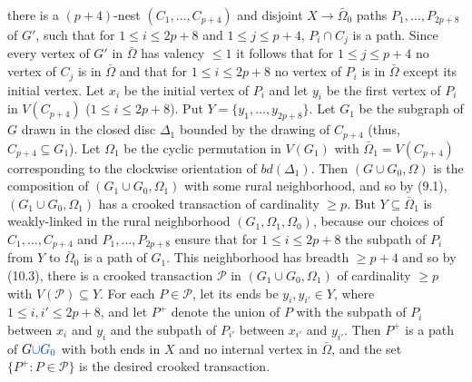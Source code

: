\noindent there is a $(p+4)$-nest $(C_1, \dots, C_{p+4})$ and disjoint $X \to \bar{\Omega}_0$ paths $P_1, \dots, P_{2p+8}$ of $G'$, such that for $1 \le i \le 2p+8$ and $1 \le j \le p+4$, $P_i \cap C_j$ is a path. Since every vertex of $G'$ in $\bar{\Omega}$ has valency $\le 1$ it follows that for $1 \le j \le p+4$ no vertex of $C_j$ is in $\bar{\Omega}$ and that for $1 \le i \le 2p+8$ no vertex of $P_i$ is in $\bar{\Omega}$ except its initial vertex. Let $x_i$ be the initial vertex of $P_i$ and let $y_i$ be the first vertex of $P_i$ in $V(C_{p+4})$ ($1 \le i \le 2p+8$). Put $Y = \{y_1, \dots, y_{2p+8}\}$. Let $G_1$ be the subgraph of $G$ drawn in the closed disc $\Delta_1$ bounded by the drawing of $C_{p+4}$ (thus, $C_{p+4} \subseteq G_1$). Let $\Omega_1$ be the cyclic permutation in $V(G_1)$ with $\bar{\Omega}_1 = V(C_{p+4})$ corresponding to the clockwise orientation of $bd(\Delta_1)$. Then $(G \cup G_0, \Omega)$ is the composition of $(G_1 \cup G_0, \Omega_1)$ with some rural neighborhood, and so by (9.1), $(G_1 \cup G_0, \Omega_1)$ has a crooked transaction of cardinality $\ge p$. But $Y \subseteq \bar{\Omega}_1$ is weakly-linked in the rural neighborhood $(G_1, \Omega_1, \Omega_0)$, because our choices of $C_1, \dots, C_{p+4}$ and $P_1, \dots, P_{2p+8}$ ensure that for $1 \le i \le 2p+8$ the subpath of $P_i$ from $Y$ to $\bar{\Omega}_0$ is a path of $G_1$. This neighborhood has breadth $\ge p+4$ and so by (10.3), there is a crooked transaction $\mathscr{P}$ in $(G_1 \cup G_0, \Omega_1)$ of cardinality $\ge p$ with $V(\mathscr{P}) \subseteq Y$. For each $P \in \mathscr{P}$, let its ends be $y_i, y_{i'} \in Y$, where $1 \le i, i' \le 2p+8$, and let $P^+$ denote the union of $P$ with the subpath of $P_i$ between $x_i$ and $y_i$ and the subpath of $P_{i'}$ between $x_{i'}$ and $y_{i'}$. Then $P^+$ is a path of $G\fix{ \cup G_0}$ with both ends in $X$ and no internal vertex in $\bar{\Omega}$, and the set $\{P^+ : P \in \mathscr{P}\}$ is the desired crooked transaction. 

